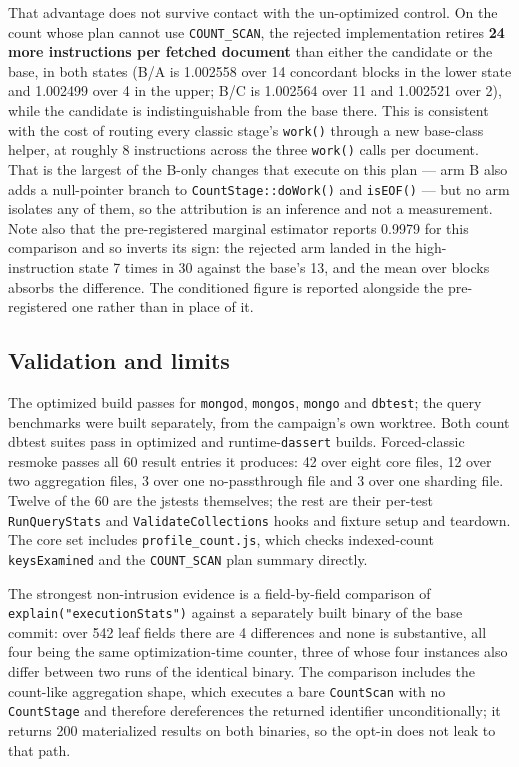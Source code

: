 \documentclass[10pt]{article}
\newcommand{\code}[1]{\texttt{#1}}
\begin{document}
That advantage does not survive contact with the un-optimized control. On the
count whose plan cannot use \code{COUNT\_SCAN}, the rejected implementation
retires \textbf{24 more instructions per fetched document} than either the
candidate or the base, in both states (B/A is 1.002558 over 14 concordant blocks
in the lower state and 1.002499 over 4 in the upper; B/C is 1.002564 over 11 and
1.002521 over 2), while the candidate is indistinguishable from the base there.
This is consistent with the cost of routing every classic stage's \code{work()}
through a new base-class helper, at roughly 8 instructions across the three
\code{work()} calls per document. That is the largest of the B-only changes that
execute on this plan --- arm B also adds a null-pointer branch to
\code{CountStage::doWork()} and \code{isEOF()} --- but no arm isolates any of
them, so the attribution is an inference and not a measurement. Note also that
the pre-registered marginal estimator reports 0.9979
for this comparison and so inverts its sign: the rejected arm landed in the
high-instruction state 7 times in 30 against the base's 13, and the mean over
blocks absorbs the difference. The conditioned figure is reported alongside the
pre-registered one rather than in place of it.

\subsection{Validation and limits}

The optimized build passes for \code{mongod}, \code{mongos}, \code{mongo} and
\code{dbtest}; the query benchmarks were built separately, from the campaign's
own worktree. Both count dbtest suites pass in
optimized and runtime-\code{dassert} builds. Forced-classic resmoke passes all
60 result entries it produces: 42 over eight core files, 12 over two aggregation
files, 3 over one no-passthrough file and 3 over one sharding file. Twelve of the
60 are the jstests themselves; the rest are their per-test \code{RunQueryStats}
and \code{ValidateCollections} hooks and fixture setup and teardown. The core set
includes \code{profile\_count.js}, which checks indexed-count \code{keysExamined}
and the \code{COUNT\_SCAN} plan summary directly.

The strongest non-intrusion evidence is a field-by-field comparison of
\code{explain(\allowbreak"executionStats")} against a separately built binary of
the base commit: over 542 leaf fields there are 4 differences and none is
substantive, all four being the same optimization-time counter, three of whose
four instances also differ between two runs of the identical binary. The comparison includes the count-like aggregation
shape, which executes a bare \code{CountScan} with no \code{CountStage} and
therefore dereferences the returned identifier unconditionally; it returns 200
materialized results on both binaries, so the opt-in does not leak to that path.
\end{document}
